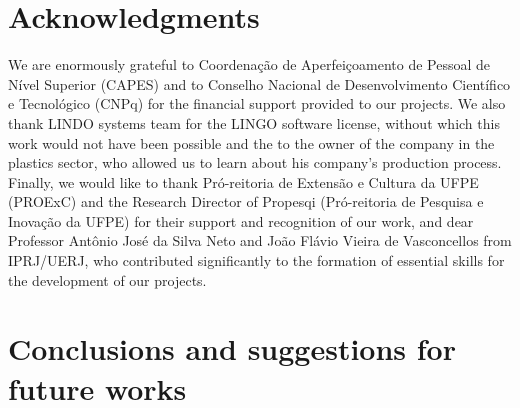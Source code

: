 \documentclass[preprint,12pt,authoryear]{elsarticle}
\begin{document}
\section{Acknowledgments}
\label{sec:acknowledgments}

We are enormously grateful to Coordenação de Aperfeiçoamento de Pessoal de Nível Superior (CAPES) and to Conselho Nacional de Desenvolvimento Científico e Tecnológico (CNPq) for the financial support provided to our projects. We also thank LINDO systems team for the LINGO software license, without which this work would not have been possible and the to the owner of the company in the plastics sector, who allowed us to learn about his company's production process. Finally, we would like to thank Pró-reitoria de Extensão e Cultura da UFPE (PROExC) and the Research Director of Propesqi (Pró-reitoria de Pesquisa e Inovação da UFPE) for their support and recognition of our work, and dear Professor Antônio José da Silva Neto and João Flávio Vieira de Vasconcellos from IPRJ/UERJ, who contributed significantly to the formation of essential skills for the development of our projects.

\section{Conclusions and suggestions for future works}
\label{sec:conclusions}





\end{document}

